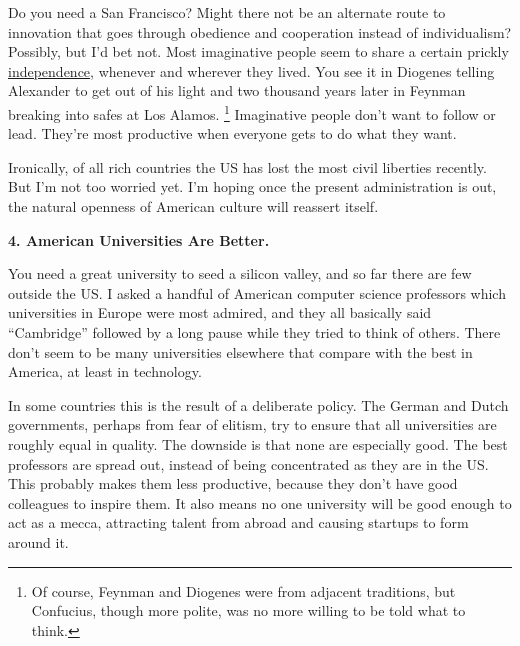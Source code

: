 Do you need a San Francisco? Might there not be an alternate route to
innovation that goes through obedience and cooperation instead of
individualism? Possibly, but I'd bet not. Most imaginative people seem
to share a certain prickly \href{gba.html}{independence}, whenever and
wherever they lived. You see it in Diogenes telling Alexander to get out
of his light and two thousand years later in Feynman breaking into safes
at Los Alamos. \footnote{Of course, Feynman and Diogenes were from adjacent traditions,
but Confucius, though more polite, was no more willing to be told what
to think.} Imaginative people don't want to
follow or lead. They're most productive when everyone gets to do what
they want.

Ironically, of all rich countries the US has lost the most civil
liberties recently. But I'm not too worried yet. I'm hoping once the
present administration is out, the natural openness of American culture
will reassert itself.

\textbf{4. American Universities Are Better.}

You need a great university to seed a silicon valley, and so far there
are few outside the US. I asked a handful of American computer science
professors which universities in Europe were most admired, and they all
basically said ``Cambridge'' followed by a long pause while they tried
to think of others. There don't seem to be many universities elsewhere
that compare with the best in America, at least in technology.

In some countries this is the result of a deliberate policy. The German
and Dutch governments, perhaps from fear of elitism, try to ensure that
all universities are roughly equal in quality. The downside is that none
are especially good. The best professors are spread out, instead of
being concentrated as they are in the US. This probably makes them less
productive, because they don't have good colleagues to inspire them. It
also means no one university will be good enough to act as a mecca,
attracting talent from abroad and causing startups to form around it.


